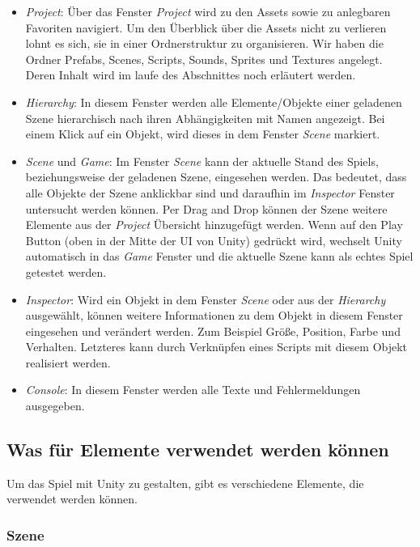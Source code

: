 \begin{itemize}
\item \textit{Project}: Über das Fenster \textit{Project} wird zu den Assets sowie zu anlegbaren Favoriten navigiert. Um den Überblick über die Assets nicht zu verlieren lohnt es sich, sie in einer Ordnerstruktur zu organisieren. Wir haben die Ordner Prefabs, Scenes, Scripts, Sounds, Sprites und Textures angelegt. Deren Inhalt wird im laufe des Abschnittes noch erläutert werden.
\item \textit{Hierarchy}: In diesem Fenster werden alle Elemente/Objekte einer geladenen Szene hierarchisch nach ihren Abhängigkeiten mit Namen angezeigt. Bei einem Klick auf ein Objekt, wird dieses in dem Fenster \textit{Scene} markiert.
\item \textit{Scene} und \textit{Game}: Im Fenster \textit{Scene} kann der aktuelle Stand des Spiels, beziehungsweise der geladenen Szene, eingesehen werden. Das bedeutet, dass alle Objekte der Szene anklickbar sind und daraufhin im \textit{Inspector} Fenster untersucht werden können. Per Drag and Drop können der Szene weitere Elemente aus der \textit{Project} Übersicht hinzugefügt werden.
Wenn auf den Play Button (oben in der Mitte der UI von Unity) gedrückt wird, wechselt Unity automatisch in das \textit{Game} Fenster und die aktuelle Szene kann als \glqq echtes \grqq Spiel getestet werden.  \newpage
\item \textit{Inspector}: Wird ein Objekt in dem Fenster \textit{Scene} oder aus der \textit{Hierarchy} ausgewählt, können weitere Informationen zu dem Objekt in diesem Fenster eingesehen und verändert werden. Zum Beispiel Größe, Position, Farbe und Verhalten. Letzteres kann durch Verknüpfen eines Scripts mit diesem Objekt realisiert werden. 
\item \textit{Console}: In diesem Fenster werden alle Texte und Fehlermeldungen ausgegeben.
\end{itemize}

\subsection{Was für Elemente verwendet werden können}
\label{Elemente}

Um das Spiel mit Unity zu gestalten, gibt es verschiedene Elemente, die verwendet werden können. 

\subsubsection{Szene}

